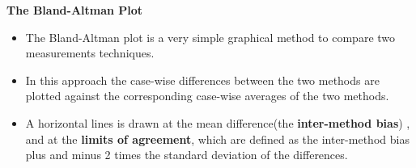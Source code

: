 \documentclass[compress]{beamer}        %
\makeatletter
\newcommand{\tcb}{\textcolor{beamer@blendedblue}}
\makeatother
\begin{document}
		\begin{frame}{\bf \tcb{The Bland-Altman Plot}}
			\large
			\begin{itemize}\itemsep0.7cm
				
				\item The Bland-Altman plot \cite{BA86,BA99} is a very simple graphical method to compare two measurements techniques. \item In this approach the case-wise differences between the two methods are plotted against the corresponding case-wise averages of the two methods.
				
				\item A horizontal lines is drawn at the mean difference(the\textbf{ inter-method bias}) , and at the \textbf{limits of agreement}, which are defined as the inter-method bias plus and minus 2 times the standard deviation of the differences.
				
			\end{itemize}
		\end{frame}
		
\end{document}
